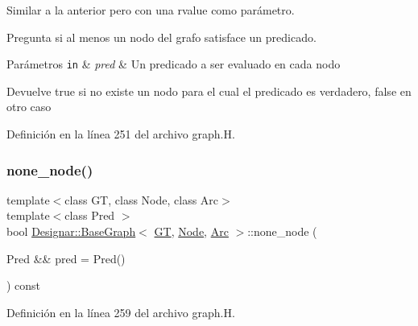 Similar a la anterior pero con una rvalue como parámetro. 

Pregunta si al menos un nodo del grafo satisface un predicado.


\begin{DoxyParams}[1]{Parámetros}
\mbox{\tt in}  & {\em pred} & Un predicado a ser evaluado en cada nodo \\
\hline
\end{DoxyParams}
\begin{DoxyReturn}{Devuelve}
{\ttfamily true} si no existe un nodo para el cual el predicado es verdadero, {\ttfamily false} en otro caso 
\end{DoxyReturn}


Definición en la línea 251 del archivo graph.\+H.

\mbox{\label{class_designar_1_1_base_graph_a394cdb81d0b0402e348dc87d2456d2d7}} 
\subsubsection{\texorpdfstring{none\+\_\+node()}{none\_node()}\hspace{0.1cm}{\footnotesize\ttfamily [2/2]}}
{\footnotesize\ttfamily template$<$class GT, class Node, class Arc$>$ \\
template$<$class Pred $>$ \\
bool \hyperlink{class_designar_1_1_base_graph}{Designar\+::\+Base\+Graph}$<$ \hyperlink{demo-buildgraph_8_c_a3001c40d2c31ca87ed96cd7d1334a55e}{GT}, \hyperlink{namespace_designar_a5af326c65aa2bd26b26c410f2030d09e}{Node}, \hyperlink{namespace_designar_a3f55fb5513d62ff47cbc8f72b8e95d6f}{Arc} $>$\+::none\+\_\+node (\begin{DoxyParamCaption}\item[{Pred \&\&}]{pred = {\ttfamily Pred()} }\end{DoxyParamCaption}) const\hspace{0.3cm}{\ttfamily [inline]}}



Definición en la línea 259 del archivo graph.\+H.

\mbox{\label{class_designar_1_1_base_graph_aa0047160fb8424fe88dc7c1785f66827}} 
